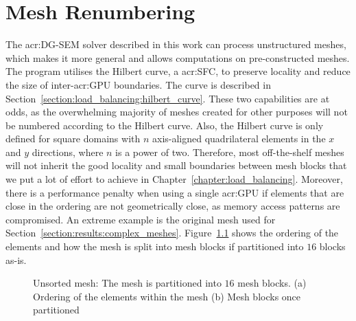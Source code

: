 \chapter{Mesh Renumbering}\label{chapter:renumbering}

The \acrshort{acr:DG-SEM} solver described in this work can process unstructured meshes, which makes
it more general and allows computations on pre-constructed meshes. The program utilises the Hilbert
curve, a \acrlong{acr:SFC}, to preserve locality and reduce the size of inter-\acrshort{acr:GPU}
boundaries. The curve is described in Section~\ref{section:load_balancing:hilbert_curve}. These two
capabilities are at odds, as the overwhelming majority of meshes created for other purposes will not
be numbered according to the Hilbert curve. Also, the Hilbert curve is only defined for square
domains with \(n\) axis-aligned quadrilateral elements in the \(x\) and \(y\) directions, where
\(n\) is a power of two. Therefore, most off-the-shelf meshes will not inherit the good locality and
small boundaries between mesh blocks that we put a lot of effort to achieve in
Chapter~\ref{chapter:load_balancing}. Moreover, there is a performance penalty when using a single
\acrshort{acr:GPU} if elements that are close in the ordering are not geometrically close, as memory
access patterns are compromised. An extreme example is the original mesh used for
Section~\ref{section:results:complex_meshes}. Figure~\ref{fig:mesh_unsorted} shows the ordering of
the elements and how the mesh is split into mesh blocks if partitioned into \(16\) blocks as-is. 

\begin{figure}[H]
    \centering
    \caption{Unsorted mesh: The mesh is partitioned into \(16\) mesh blocks. (a) Ordering of the elements within the mesh (b) Mesh blocks once partitioned}\label{fig:mesh_unsorted}
\end{figure}

